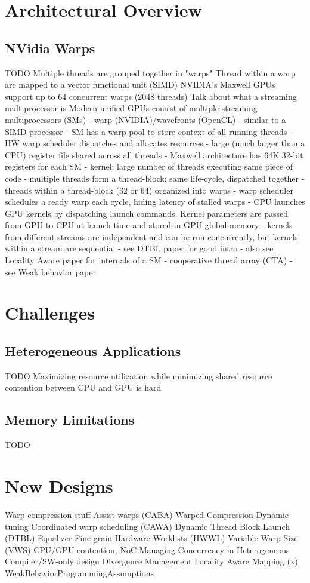 \documentclass[prodmode,acmtecs]{acmsmall} %
\begin{document}
\section{Architectural Overview}
\subsection{NVidia Warps}
TODO
Multiple threads are grouped together in "warps"
Thread within a warp are mapped to a vector functional unit (SIMD)
NVIDIA's Maxwell GPUs support up to 64 concurrent warps (2048 threads)
Talk about what a streaming multiprocessor is
Modern unified GPUs consist of multiple streaming multiprocessors (SMs)
  - warp (NVIDIA)/wavefronts (OpenCL)
  - similar to a SIMD processor
  - SM has a warp pool to store context of all running threads
  - HW warp scheduler dispatches and allocates resources
  - large (much larger than a CPU) register file shared across all threads
    - Maxwell architecture has 64K 32-bit registers for each SM
  - kernel: large number of threads executing same piece of code
  - multiple threads form a thread-block; same life-cycle, dispatched together
  - threads within a thread-block (32 or 64) organized into warps
  - warp scheduler schedules a ready warp each cycle, hiding latency of stalled warps
  - CPU launches GPU kernels by dispatching launch commands. Kernel parameters are passed from GPU to CPU at launch time and stored in GPU global memory
  - kernels from different streams are independent and can be run concurrently, but kernels within a stream are sequential
  - see DTBL paper for good intro
  - also see Locality Aware paper for internals of a SM
  - cooperative thread array (CTA) - see Weak behavior paper

\section{Challenges}
\subsection{Heterogeneous Applications}
TODO
Maximizing resource utilization while minimizing shared resource contention between CPU and GPU is hard
\subsection{Memory Limitations}
TODO

\section{New Designs}
Warp compression stuff
  Assist warps (CABA)
  Warped Compression
Dynamic tuning
  Coordinated warp scheduling (CAWA)
  Dynamic Thread Block Launch (DTBL)
  Equalizer
  Fine-grain Hardware Worklists (HWWL)
  Variable Warp Size (VWS)
CPU/GPU contention, NoC
  Managing Concurrency in Heterogeneous
Compiler/SW-only design
  Divergence Management
  Locality Aware Mapping
  (x) WeakBehaviorProgrammingAssumptions
\end{document}
